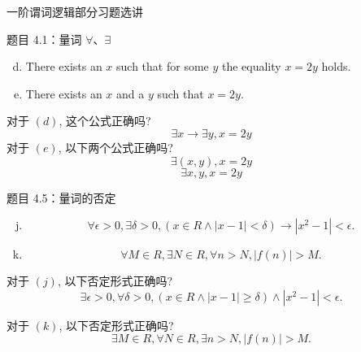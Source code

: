 \begin{frame}{}
  \centerline{\LARGE 一阶谓词逻辑部分习题选讲}
\end{frame}

\begin{frame}{}
  \begin{exampleblock}{题目 4.1：量词 $\forall$、$\exists$}
    \begin{enumerate}[(a)]
      \setcounter{enumi}{3}
      \item There exists an $x$ such that for some $y$ the equality $x = 2y$ holds.
      \item There exists an $x$ and a $y$ such that $x = 2y$.
    \end{enumerate}
  \end{exampleblock}

  \vspace{0.60cm}
  \pause
  对于 $(d)$, 这个公式正确吗?
  \[
    \exists x \to \exists y, x = 2y
  \]
  \pause
  对于 $(e)$, 以下两个公式正确吗?
  \[
    \exists (x,y), x = 2y
  \]
  \vspace{-0.30cm}
  \[
    \exists x, y, x = 2y
  \]
\end{frame}

\begin{frame}{}
  \begin{exampleblock}{题目 4.5：量词的否定}
    \begin{enumerate}[(a)]
      \setcounter{enumi}{9}
      \item 
	\[
	  \forall \epsilon > 0, \exists \delta > 0, (x \in R \land |x - 1| < \delta) \to |x^2 - 1| < \epsilon.
	\]
      \item
	\[
	  \forall M \in R, \exists N \in R, \forall n > N, |f(n)| > M.
	\]
    \end{enumerate}
  \end{exampleblock}

  \vspace{0.50cm}
  \pause
  对于 $(j)$, 以下否定形式正确吗?
  \[
      \exists \epsilon > 0, \forall \delta > 0, (x \in R \land |x - 1| \ge \delta) \land |x^2 - 1| < \epsilon.
  \]

  \pause
  对于 $(k)$, 以下否定形式正确吗?
  \[
    \exists M \in R, \forall N \in R, \exists n > N, |f(n)| > M.
  \]
\end{frame}

